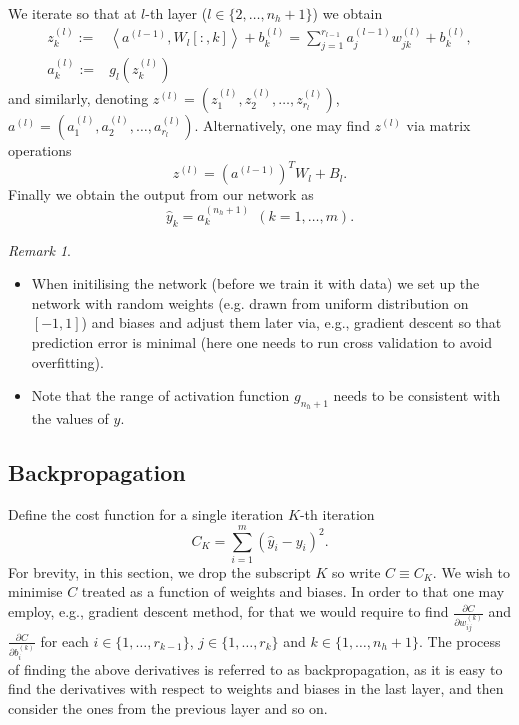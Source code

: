 \documentclass[12pt]{amsart}
\theoremstyle{remark}
\newtheorem{remark}[theorem]{Remark}
\theoremstyle{definition}
\numberwithin{equation}{section}
\begin{document}
\noindent 
We iterate so that at $l$-th layer ($l \in \{2, \ldots, n_h+1\}$) we obtain
\begin{align*}
z_k^{(l)} :=& \left< a^{(l-1)}, W_{l}[:, k]\right> + b_k^{(l)} = \sum_{j=1}^{r_{l-1}} a_{j}^{(l-1)}w_{jk}^{(l)} +  b_k^{(l)},\\
a_k^{(l)} :=& g_{l}(z_k^{(l)})
\end{align*}
and similarly, denoting 
$z^{(l)} = (z_1^{(l)}, z_2^{(l)},\ldots, z_{r_l}^{(l)})$, $a^{(l)} = (a_1^{(l)}, a_2^{(l)},\ldots, a_{r_l}^{(l)})$.
Alternatively, one may find $z^{(l)}$ via matrix operations
$$z^{(l)} = \left(a^{(l-1)}\right)^TW_l + B_l.$$
\noindent 
Finally we obtain the output from our network as 
$$ \widehat{y}_k = a_{k}^{(n_h+1)} \ \ (k = 1, \ldots, m).$$
\begin{remark} \enskip 
	\begin{itemize} 
\item When initilising the network (before we train it with data) we set up the network with random weights (e.g. drawn from uniform distribution on $[-1, 1]$) and biases and adjust them later via, e.g., gradient descent so that prediction error is minimal (here one needs to run cross validation to avoid overfitting).
\item Note that the range of activation function $g_{n_h+1}$ needs to be consistent with the values of $y$. 
\end{itemize}
\end{remark}
\subsection{Backpropagation}

Define the cost function for a single iteration $K$-th iteration
$$ C_K = \sum_{i=1}^m (\widehat{y}_i - y_i)^2.$$
For brevity, in this section, we drop the subscript $K$ so write $C \equiv C_K$.
We wish to minimise $C$ treated as a function of weights and biases. 
In order to that one may employ, e.g., gradient descent method, for that we would require to find 
$\frac{\partial C}{ \partial w_{ij}^{(k)} }$ and $\frac{\partial C}{ \partial b_{i}^{(k)} }$ for each $i \in \{1, \ldots, r_{k-1}\}$, $j \in \{1, \ldots, r_k\}$ and $k \in \{1, \ldots, n_h+1\}$.
The process of finding the above derivatives is referred to as backpropagation, as it is easy to find the derivatives with respect to weights and biases in the last layer, and then consider the ones from the previous layer and so on.  
\end{document}
